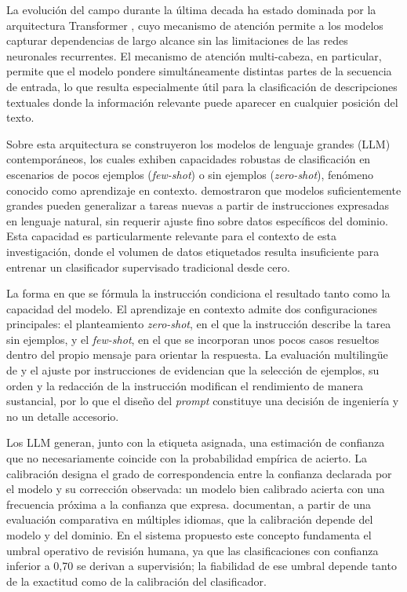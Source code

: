 La evolución del campo durante la última decada ha estado dominada por la arquitectura Transformer \parencite{Vaswani2017_attention}, cuyo mecanismo de atención permite a los modelos capturar dependencias de largo alcance sin las limitaciones de las redes neuronales recurrentes. El mecanismo de atención multi-cabeza, en particular, permite que el modelo pondere simultáneamente distintas partes de la secuencia de entrada, lo que resulta especialmente útil para la clasificación de descripciones textuales donde la información relevante puede aparecer en cualquier posición del texto.

Sobre esta arquitectura se construyeron los modelos de lenguaje grandes (LLM) contemporáneos, los cuales exhiben capacidades robustas de clasificación en escenarios de pocos ejemplos (\emph{few-shot}) o sin ejemplos (\emph{zero-shot}), fenómeno conocido como aprendizaje en contexto. \textcite{Brown2020_few_shot} demostraron que modelos suficientemente grandes pueden generalizar a tareas nuevas a partir de instrucciones expresadas en lenguaje natural, sin requerir ajuste fino sobre datos específicos del dominio. Esta capacidad es particularmente relevante para el contexto de esta investigación, donde el volumen de datos etiquetados resulta insuficiente para entrenar un clasificador supervisado tradicional desde cero.

La forma en que se fórmula la instrucción condiciona el resultado tanto como la capacidad del modelo. El aprendizaje en contexto admite dos configuraciones principales: el planteamiento \emph{zero-shot}, en el que la instrucción describe la tarea sin ejemplos, y el \emph{few-shot}, en el que se incorporan unos pocos casos resueltos dentro del propio mensaje para orientar la respuesta. La evaluación multilingüe de \textcite{ahuja2023mega} y el ajuste por instrucciones de \textcite{lai2023okapi} evidencian que la selección de ejemplos, su orden y la redacción de la instrucción modifican el rendimiento de manera sustancial, por lo que el diseño del \emph{prompt} constituye una decisión de ingeniería y no un detalle accesorio.

Los LLM generan, junto con la etiqueta asignada, una estimación de confianza que no necesariamente coincide con la probabilidad empírica de acierto. La calibración designa el grado de correspondencia entre la confianza declarada por el modelo y su corrección observada: un modelo bien calibrado acierta con una frecuencia próxima a la confianza que expresa. \textcite{xuan2025mmluprox} documentan, a partir de una evaluación comparativa en múltiples idiomas, que la calibración depende del modelo y del dominio. En el sistema propuesto este concepto fundamenta el umbral operativo de revisión humana, ya que las clasificaciones con confianza inferior a 0,70 se derivan a supervisión; la fiabilidad de ese umbral depende tanto de la exactitud como de la calibración del clasificador.

